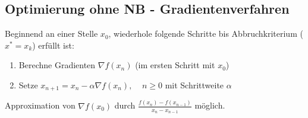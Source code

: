 \subsection{Optimierung ohne NB - Gradientenverfahren}
Beginnend an einer Stelle \(x_0\), wiederhole folgende Schritte bis Abbruchkriterium (\(x^*=x_k\)) erfüllt ist: 
\begin{enumerate}
\item Berechne Gradienten \(\nabla f(x_n)\) (im ersten Schritt mit \(x_0\))
\item Setze \(x_{n+1} = x_n - \alpha \nabla f(x_n), \;\;\;\; n \geq 0\) mit Schrittweite \(\alpha\)
\end{enumerate}

Approximation von \(\nabla f(x_0)\) durch \(\frac{f(x_n) - f(x_{n-1})}{x_n - x_{n-1}}\) möglich.